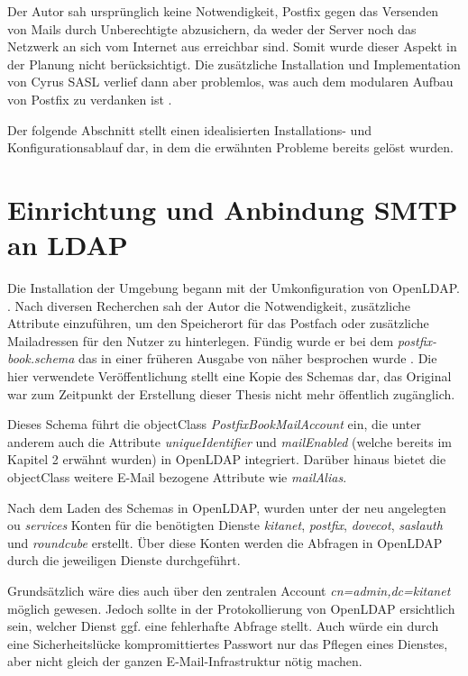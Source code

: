 Der Autor sah ursprünglich keine Notwendigkeit, Postfix gegen das Versenden von Mails durch Unberechtigte abzusichern, da weder der Server noch das Netzwerk an sich vom Internet aus erreichbar sind. 
Somit wurde dieser Aspekt in der Planung nicht berücksichtigt. 
Die zusätzliche Installation und Implementation von Cyrus SASL verlief dann aber problemlos, was auch dem modularen Aufbau von Postfix zu verdanken ist \citep[zu Postfix und Cyrus SASL vgl.][S. 210 ff.]{Heinlein2004}.

Der folgende Abschnitt stellt einen idealisierten Installations- und Konfigurationsablauf dar, in dem die erwähnten Probleme bereits gelöst wurden.

\section{Einrichtung und Anbindung SMTP an LDAP}

Die Installation der Umgebung begann mit der Umkonfiguration von OpenLDAP.  \citep[][615]{Deimeke2019}. 
Nach diversen Recherchen sah der Autor die Notwendigkeit, zusätzliche Attribute einzuführen, um den Speicherort für das Postfach oder zusätzliche Mailadressen für den Nutzer zu hinterlegen. 
Fündig wurde er bei dem \textit{postfix-book.schema} das in einer früheren Ausgabe von \cite{Heinlein2004} näher besprochen wurde \citep[vgl.][]{pfschema}. Die hier verwendete Veröffentlichung stellt eine Kopie des Schemas dar, das Original war zum Zeitpunkt der Erstellung dieser Thesis nicht mehr öffentlich zugänglich.

Dieses Schema führt die objectClass \textit{PostfixBookMailAccount} ein, die unter anderem auch die Attribute \textit{uniqueIdentifier} und \textit{mailEnabled} (welche bereits im Kapitel 2 erwähnt wurden) in OpenLDAP integriert. Darüber hinaus bietet die objectClass weitere E-Mail bezogene Attribute wie \zb \textit{mailAlias}.  

Nach dem Laden des Schemas in OpenLDAP, wurden unter der neu angelegten \ac{ou} \textit{services} Konten für die benötigten Dienste \textit{kitanet}, \textit{postfix}, \textit{dovecot}, \textit{saslauth} und \textit{roundcube} erstellt. 
Über diese Konten werden die Abfragen in OpenLDAP durch die jeweiligen Dienste durchgeführt. 

Grundsätzlich wäre dies auch über den zentralen Account \textit{cn=admin,dc=kitanet} möglich gewesen. 
Jedoch sollte in der Protokollierung von OpenLDAP ersichtlich sein, welcher Dienst ggf. eine fehlerhafte Abfrage stellt. 
Auch würde ein durch eine Sicherheitslücke kompromittiertes Passwort nur das Pflegen eines Dienstes, aber nicht gleich der ganzen E-Mail-Infrastruktur nötig machen.

